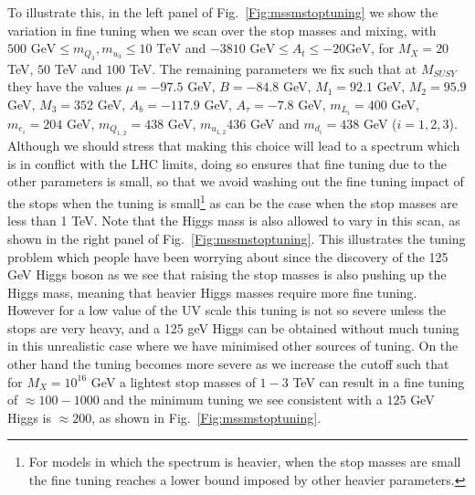 \documentclass[preprint,amsmath,amssymb,aps,superscriptaddress,prd,showpacs,floatfix,nofootinbib]{revtex4-1}
\begin{document}
To illustrate this, in the left panel of Fig.~\ref{Fig:mssmstoptuning}
we show the variation in fine tuning when we scan over the stop masses
and mixing, with $500 \textrm{ GeV} \leq m_{Q_3},m_{u_3}\leq
10\textrm{ TeV}$ and $-3810\textrm{ GeV}\leq A_t\leq -20\textrm{
  GeV}$, for $M_X=20$ TeV, $50$ TeV and $100$ TeV.  The remaining
parameters we fix such that at $M_{SUSY}$ they have the values
$\mu=-97.5$ GeV, $B=-84.8$ GeV, $M_1=92.1$ GeV, $M_2=95.9$ GeV,
$M_3=352$ GeV, $A_b=-117.9$ GeV, $A_\tau=-7.8$ GeV, $m_{L_i}=400$ GeV,
$m_{e_i}=204$ GeV, $m_{Q_{1,2}}=438$ GeV, $m_{u_{1,2}}436$ GeV and
$m_{d_i}=438$ GeV ($i=1,2,3$). Although we should stress that making
this choice will lead to a spectrum which is in conflict with the LHC
limits, doing so ensures that fine tuning due to the other parameters
is small, so that we avoid washing out the fine tuning impact of the
stops when the tuning is small\footnote{For models in which the
  spectrum is heavier, when the stop masses are small the fine tuning
  reaches a lower bound imposed by other heavier parameters.} as can
be the case when the stop masses are less than 1 TeV.  Note that the
Higgs mass is also allowed to vary in this scan, as shown in the right
panel of Fig.~\ref{Fig:mssmstoptuning}. This illustrates the tuning
problem which people have been worrying about since the discovery of
the 125 GeV Higgs boson as we see that raising the stop masses is also
pushing up the Higgs mass, meaning that heavier Higgs masses require
more fine tuning.  However for a low value of the UV scale this tuning
is not so severe unless the stops are very heavy, and a 125 geV Higgs
can be obtained without much tuning in this unrealistic case where we
have minimised other sources of tuning.  On the other hand the tuning
becomes more severe as we increase the cutoff such that for $M_X =
10^{16}$ GeV a lightest stop masses of $1-3$ TeV can result in a fine
tuning of $\approx 100 - 1000$ and the minimum tuning we see consistent
with a $125$ GeV Higgs is $\approx 200$, as shown in
Fig.~\ref{Fig:mssmstoptuning}.

\end{document}
